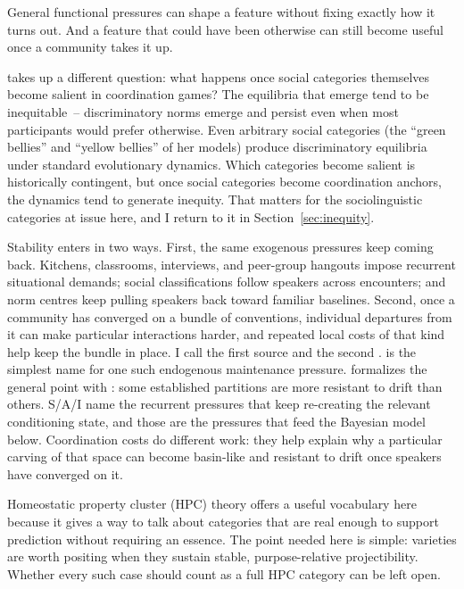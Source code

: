 \documentclass[11pt,letterpaper]{article}
\begin{document}
General functional pressures can shape a feature without fixing exactly how it turns out. And a feature that could have been otherwise can still become useful once a community takes it up.

\textcite{oconnor2022contracts} takes up a different question: what happens once social categories themselves become salient in coordination games? The equilibria that emerge tend to be inequitable~-- discriminatory norms emerge and persist even when most participants would prefer otherwise. Even arbitrary social categories (the \enquote{green bellies} and \enquote{yellow bellies} of her models) produce discriminatory equilibria under standard evolutionary dynamics. Which categories become salient is historically contingent, but once social categories become coordination anchors, the dynamics tend to generate inequity. That matters for the sociolinguistic categories at issue here, and I return to it in Section~\ref{sec:inequity}.

Stability enters in two ways. First, the same exogenous pressures keep coming back. Kitchens, classrooms, interviews, and peer-group hangouts impose recurrent situational demands; social classifications follow speakers across encounters; and norm centres keep pulling speakers back toward familiar baselines. Second, once a community has converged on a bundle of conventions, individual departures from it can make particular interactions harder, and repeated local costs of that kind help keep the bundle in place. I call the first source  and the second .  is the simplest name for one such endogenous maintenance pressure. \textcite{oconnor2021-conventionality} formalizes the general point with : some established partitions are more resistant to drift than others. S/A/I name the recurrent pressures that keep re-creating the relevant conditioning state, and those are the pressures that feed the Bayesian model below. Coordination costs do different work: they help explain why a particular carving of that space can become basin-like and resistant to drift once speakers have converged on it.

Homeostatic property cluster (HPC) theory offers a useful vocabulary here because it gives a way to talk about categories that are real enough to support prediction without requiring an essence. The point needed here is simple: varieties are worth positing when they sustain stable, purpose-relative projectibility. Whether every such case should count as a full HPC category can be left open.
\end{document}
